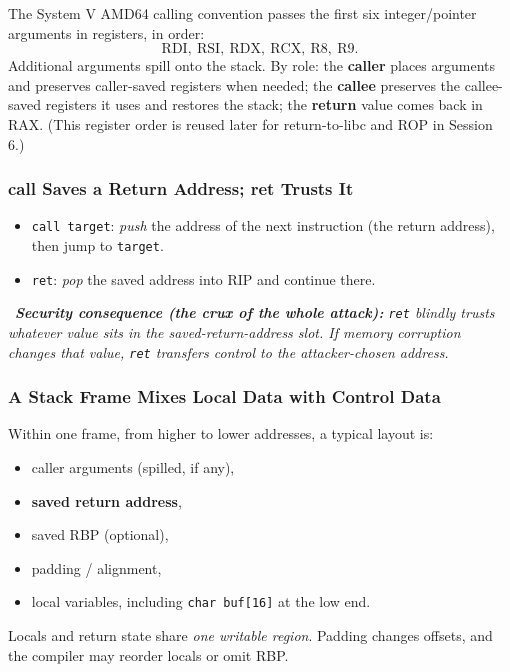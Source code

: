 \documentclass[hidelinks]{article}
\newcommand{\callout}[1]{\par\smallskip\noindent{\color{capri}$\blacktriangleright$}\ \textit{#1}\par\smallskip}
\begin{document}
The System V AMD64 calling convention passes the first six integer/pointer arguments in registers, in order:
\[
\text{RDI},\ \text{RSI},\ \text{RDX},\ \text{RCX},\ \text{R8},\ \text{R9}.
\]
Additional arguments spill onto the stack. By role: the \textbf{caller} places arguments and preserves caller-saved registers when needed; the \textbf{callee} preserves the callee-saved registers it uses and restores the stack; the \textbf{return} value comes back in RAX. (This register order is reused later for return-to-libc and ROP in Session 6.)

\subsubsection{call Saves a Return Address; ret Trusts It}

\begin{itemize}
    \item \texttt{call target}: \emph{push} the address of the next instruction (the return address), then jump to \texttt{target}.
    \item \texttt{ret}: \emph{pop} the saved address into RIP and continue there.
\end{itemize}

\callout{\textbf{Security consequence (the crux of the whole attack):} \texttt{ret} blindly trusts whatever value sits in the saved-return-address slot. If memory corruption changes that value, \texttt{ret} transfers control to the attacker-chosen address.}

\subsubsection{A Stack Frame Mixes Local Data with Control Data}

Within one frame, from higher to lower addresses, a typical layout is:
\begin{itemize}
    \item caller arguments (spilled, if any),
    \item \textbf{saved return address},
    \item saved RBP (optional),
    \item padding / alignment,
    \item local variables, including \texttt{char buf[16]} at the low end.
\end{itemize}
Locals and return state share \emph{one writable region}. Padding changes offsets, and the compiler may reorder locals or omit RBP.
\end{document}
